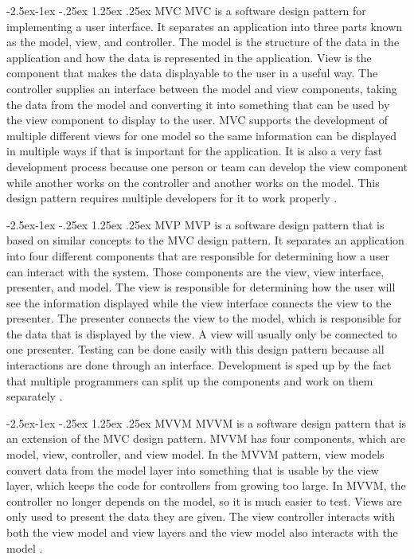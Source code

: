 \documentclass[onecolumn, draftclsnofoot,10pt, compsoc]{IEEEtran}
\makeatletter
\renewcommand\paragraph{\@startsection{paragraph}{4}{\z@}%
            {-2.5ex\@plus -1ex \@minus -.25ex}%
            {1.25ex \@plus .25ex}%
            {\normalfont\normalsize\bfseries}}
\makeatother
\begin{document}
\paragraph{MVC}
MVC is a software design pattern for implementing a user interface. It separates an application into three parts known as the model, view, and controller. The model is the structure of the data in the application and how the data is represented in the application. View is the component that makes the data displayable to the user in a useful way. The controller supplies an interface between the model and view components, taking the data from the model and converting it into something that can be used by the view component to display to the user. MVC supports the development of multiple different views for one model so the same information can be displayed in multiple ways if that is important for the application. It is also a very fast development process because one person or team can develop the view component while another works on the controller and another works on the model. This design pattern requires multiple developers for it to work properly \cite{mvc}.

\paragraph{MVP}
MVP is a software design pattern that is based on similar concepts to the MVC design pattern. It separates an application into four different components that are responsible for determining how a user can interact with the system. Those components are the view, view interface, presenter, and model. The view is responsible for determining how the user will see the information displayed while the view interface connects the view to the presenter. The presenter connects the view to the model, which is responsible for the data that is displayed by the view. A view will usually only be connected to one presenter. Testing can be done easily with this design pattern because all interactions are done through an interface. Development is sped up by the fact that multiple programmers can split up the components and work on them separately \cite{mvp}.

\paragraph{MVVM}
MVVM is a software design pattern that is an extension of the MVC design pattern. MVVM has four components, which are model, view, controller, and view model. In the MVVM pattern, view models convert data from the model layer into something that is usable by the view layer, which keeps the code for controllers from growing too large. In MVVM, the controller no longer depends on the model, so it is much easier to test. Views are only used to present the data they are given. The view controller interacts with both the view model and view layers and the view model also interacts with the model \cite{mvvm}.
\end{document}
